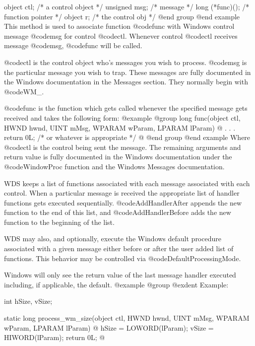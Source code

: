 object   ctl;      /*  a control object  */
unsigned msg;      /*  message           */
long    (*func)(); /*  function pointer  */
object  r;         /*  the control obj   */
@end group
@end example
This method is used to associate function @code{func} with Windows control
message @code{msg} for control @code{ctl}.  Whenever control @code{ctl}
receives message @code{msg}, @code{func} will be called.

@code{ctl} is the control object who's messages you wish to process.
@code{msg} is the particular message you wish to trap.  These messages
are fully documented in the Windows documentation in the Messages
section.  They normally begin with @code{WM_}.

@code{func} is the function which gets called whenever the specified
message gets received and takes the following form:
@example
@group
long    func(object     ctl,
             HWND       hwnd, 
             UINT       mMsg, 
             WPARAM     wParam, 
             LPARAM     lParam)
@{
        .
        .
        .
        return 0L;  /* or whatever is appropriate  */
@}
@end group
@end example
Where @code{ctl} is the control being sent the message.  The remaining
arguments and return value is fully documented in the Windows documentation
under the @code{WindowProc} function and the Windows Messages documentation.

WDS keeps a list of functions associated with each message associated
with each control.  When a particular message is received the appropriate
list of handler functions gets executed sequentially.
@code{AddHandlerAfter} appends the new function to the end of this list,
and @code{AddHandlerBefore} adds the new function to the beginning of
the list.

WDS may also, and optionally, execute the Windows default procedure
associated with a given message either before or after the user added
list of functions.  This behavior may be controlled via
@code{DefaultProcessingMode}.

Windows will only see the return value of the last message handler executed
including, if applicable, the default.
@example
@group
@exdent Example:

int     hSize, vSize;

static  long    process_wm_size(object  ctl, 
                                HWND    hwnd, 
                                UINT    mMsg, 
                                WPARAM  wParam, 
                                LPARAM  lParam)
@{
        hSize = LOWORD(lParam);
        vSize = HIWORD(lParam);
        return 0L;
@}

